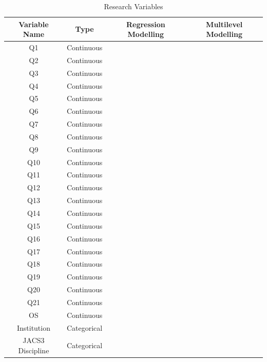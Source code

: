 \documentclass[11pt,a4paper]{report}
\begin{document}
\begin{table}
	\centering
	\caption{Research Variables}
	\begin{tabular}{c c c c}
		\hline \hline
		Variable Name & Type & Regression Modelling & Multilevel Modelling\\		
		\hline
		Q1 & Continuous & \checkmark & \checkmark \\[0.2cm]
		Q2 & Continuous & \checkmark & \checkmark \\[0.2cm]
		Q3 & Continuous & \checkmark & \checkmark \\[0.2cm]
		Q4 & Continuous & \checkmark & \checkmark \\[0.2cm]
		Q5 & Continuous & \checkmark & \checkmark \\[0.2cm]
		Q6 & Continuous & \checkmark & \checkmark \\[0.2cm]
		Q7 & Continuous & \checkmark & \checkmark \\[0.2cm]
		Q8 & Continuous & \checkmark & \checkmark \\[0.2cm]
		Q9 & Continuous & \checkmark & \checkmark \\[0.2cm]
		Q10 & Continuous & \checkmark & \checkmark \\[0.2cm]
		Q11 & Continuous & \checkmark & \checkmark \\[0.2cm]
		Q12 & Continuous & \checkmark & \checkmark \\[0.2cm]
		Q13 & Continuous & \checkmark & \checkmark \\[0.2cm]
		Q14 & Continuous & \checkmark & \checkmark \\[0.2cm]
		Q15 & Continuous & \checkmark & \checkmark \\[0.2cm]
		Q16 & Continuous & \checkmark & \checkmark \\[0.2cm]
		Q17 & Continuous & \checkmark & \checkmark \\[0.2cm]
		Q18 & Continuous & \checkmark & \checkmark \\[0.2cm]
		Q19 & Continuous & \checkmark & \checkmark \\[0.2cm]
		Q20 & Continuous & \checkmark & \checkmark \\[0.2cm]
		Q21 & Continuous & \checkmark & \checkmark \\[0.2cm]
		OS & Continuous & \checkmark & \checkmark \\[0.2cm]
		Institution & Categorical & & \checkmark \\[0.2cm]
		JACS3 Discipline & Categorical & & \checkmark \\[0.2cm]
		\hline \hline
	\end{tabular}

	\label{table:variables}
\end{table}
\end{document}
